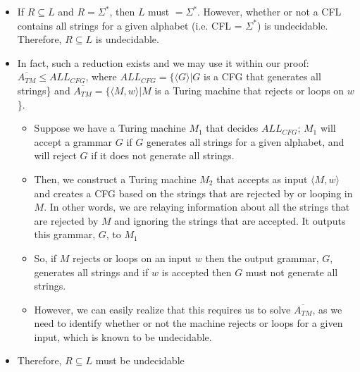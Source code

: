 \documentclass{article}
\begin{document}
\begin{itemize}
    \item If \(R \subseteq L\) and \(R = \Sigma^*\), then \(L \) must \(= \Sigma^*\). However, whether or not a CFL contains all strings for a given alphabet (i.e. CFL = \(\Sigma^*\)) is undecidable. Therefore, \(R \subseteq L\) is undecidable.
    
    \item In fact, such a reduction exists and we may use it within our proof: \(\overline{A_{TM}} \leq ALL_{CFG}\), where \(ALL_{CFG} = \{\langle G \rangle | G\) is a CFG that generates all strings\} and \(\overline{A_{TM}} = \{\langle M, w\rangle | M\) is a Turing machine that rejects or loops on \(w\)\}.
    \begin{itemize}
        \item Suppose we have a Turing machine \(M_1\) that decides \(ALL_{CFG}\); \(M_1\) will accept a grammar \(G\) if \(G\) generates all strings for a given alphabet, and will reject \(G\) if it does not generate all strings.
        \item Then, we construct a Turing machine \(M_2\) that accepts as input \(\langle M, w \rangle\) and creates a CFG based on the strings that are rejected by or looping in \(M\). In other words, we are relaying information about all the strings that are rejected by \(M\) and ignoring the strings that are accepted. It outputs this grammar, \(G\), to \(M_1\)
        \item So, if \(M\) rejects or loops on an input \(w\) then the output grammar, \(G\), generates all strings and if \(w\) is accepted then \(G\) must not generate all strings.
        \item However, we can easily realize that this requires us to solve \(\overline{A_{TM}}\), as we need to identify whether or not the machine rejects or loops for a given input, which is known to be undecidable.
    \end{itemize}
    \item Therefore, \(R \subseteq L\) must be undecidable
\end{itemize}
\end{document}
